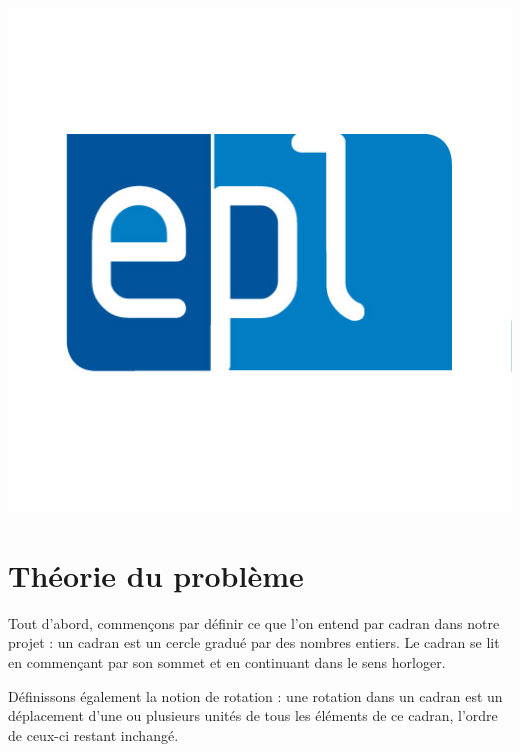 \begin{titlepage}
			\includegraphics[scale=0.20]{EPL_UCL_Logo.jpg}\\[1cm] %
		
		\vfill %
		
	\end{titlepage}
		

\newpage
	\section{Théorie du problème}
	Tout d’abord, commençons par définir ce que l’on entend par cadran dans notre projet : un cadran est un cercle gradué par des nombres entiers. Le cadran se lit en commençant par son sommet et en continuant dans le sens horloger.
	
	Définissons également la notion de rotation : une rotation dans un cadran est un déplacement d’une ou plusieurs unités de tous les éléments de ce cadran, l’ordre de ceux-ci restant inchangé.
	
